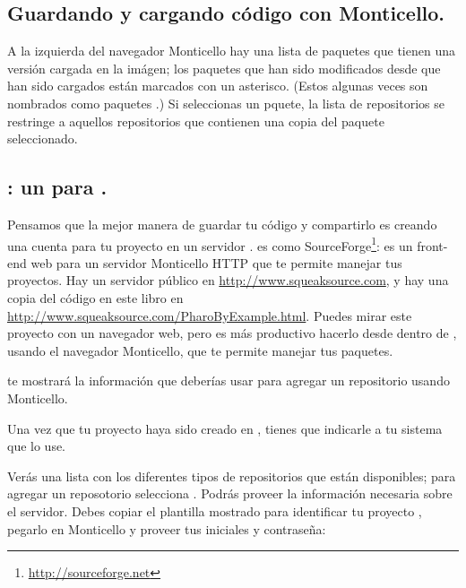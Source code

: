 \documentclass[a4paper,10pt,twoside]{book}
\begin{document}
\subsection{Guardando y cargando c\'odigo con Monticello.}

A la izquierda del navegador Monticello hay una lista de paquetes que tienen una versi\'on cargada en la im\'agen; los paquetes que han sido modificados desde que han sido cargados est\'an marcados con un asterisco. (Estos algunas veces son nombrados como paquetes .) Si seleccionas un pquete, la lista de repositorios se restringe a aquellos repositorios que contienen una copia del paquete seleccionado.


\subsection{\ind{\sqsrc}: un  para \pharo.} 

Pensamos que la mejor manera de guardar tu c\'odigo y compartirlo es creando una cuenta para tu proyecto en un servidor \sqsrc. \sqsrc es como SourceForge\footnote{\url{http://sourceforge.net}}: es un front-end web para un servidor Monticello HTTP que te permite manejar tus proyectos.
Hay un servidor \sqsrc p\'ublico en \url{http://www.squeaksource.com}, y hay una copia del c\'odigo en este libro en \url{http://www.squeaksource.com/PharoByExample.html}. Puedes mirar este proyecto con un navegador web, pero es m\'as productivo hacerlo desde dentro de \pharo, usando el navegador Monticello, que te permite manejar tus paquetes.

\sqsrc te mostrar\'a la informaci\'on que deber\'ias usar para agregar un repositorio usando Monticello.

Una vez que tu proyecto haya sido creado en \sqsrc, tienes que indicarle a tu sistema \pharo que lo use. 

Ver\'as una lista con los diferentes tipos de repositorios que est\'an disponibles; para agregar un reposotorio \sqsrc selecciona . Podr\'as proveer la informaci\'on necesaria sobre el servidor. 
Debes copiar el plantilla mostrado para identificar tu proyecto \sqsrc, pegarlo en Monticello y proveer tus iniciales y contrase\~na:
\end{document}
